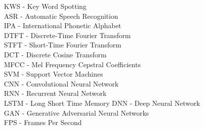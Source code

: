 
KWS - Key Word Spotting\\
ASR - Automatic Speech Recognition\\
IPA - International Phonetic Alphabet\\

DTFT - Discrete-Time Fourier Transform\\
STFT - Short-Time Fourier Transform\\
DCT - Discrete Cosine Transform\\
MFCC - Mel Frequency Cepstral Coefficients\\

SVM - Support Vector Machines\\

CNN - Convolutional Neural Network\\
RNN - Recurrent Neural Network\\
LSTM - Long Short Time Memory
DNN - Deep Neural Network\\
GAN - Generative Adversarial Neural Networks\\

FPS - Frames Per Second\\